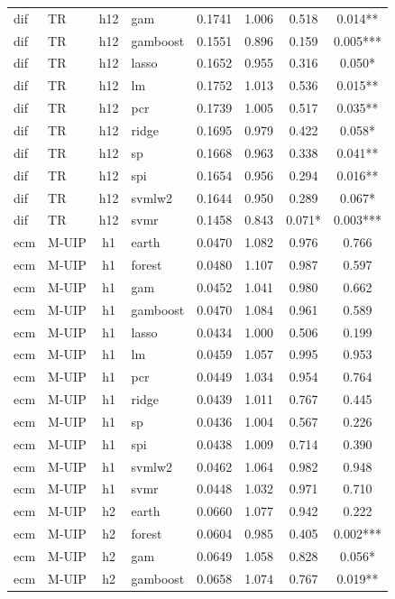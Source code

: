 \begin{ThreePartTable}
\begin{longtable}[t]{llclcccc}
dif & TR & h12 & gam & 0.1741 & 1.006 & 0.518 & 0.014**\\
dif & TR & h12 & gamboost & 0.1551 & 0.896 & 0.159 & 0.005***\\
dif & TR & h12 & lasso & 0.1652 & 0.955 & 0.316 & 0.050*\\
dif & TR & h12 & lm & 0.1752 & 1.013 & 0.536 & 0.015**\\
dif & TR & h12 & pcr & 0.1739 & 1.005 & 0.517 & 0.035**\\
dif & TR & h12 & ridge & 0.1695 & 0.979 & 0.422 & 0.058*\\
dif & TR & h12 & sp & 0.1668 & 0.963 & 0.338 & 0.041**\\
dif & TR & h12 & spi & 0.1654 & 0.956 & 0.294 & 0.016**\\
dif & TR & h12 & svmlw2 & 0.1644 & 0.950 & 0.289 & 0.067*\\
dif & TR & h12 & svmr & 0.1458 & 0.843 & 0.071* & 0.003***\\
\addlinespace
ecm & M-UIP & h1 & earth & 0.0470 & 1.082 & 0.976 & 0.766\\
ecm & M-UIP & h1 & forest & 0.0480 & 1.107 & 0.987 & 0.597\\
ecm & M-UIP & h1 & gam & 0.0452 & 1.041 & 0.980 & 0.662\\
ecm & M-UIP & h1 & gamboost & 0.0470 & 1.084 & 0.961 & 0.589\\
ecm & M-UIP & h1 & lasso & 0.0434 & 1.000 & 0.506 & 0.199\\
ecm & M-UIP & h1 & lm & 0.0459 & 1.057 & 0.995 & 0.953\\
ecm & M-UIP & h1 & pcr & 0.0449 & 1.034 & 0.954 & 0.764\\
ecm & M-UIP & h1 & ridge & 0.0439 & 1.011 & 0.767 & 0.445\\
ecm & M-UIP & h1 & sp & 0.0436 & 1.004 & 0.567 & 0.226\\
ecm & M-UIP & h1 & spi & 0.0438 & 1.009 & 0.714 & 0.390\\
ecm & M-UIP & h1 & svmlw2 & 0.0462 & 1.064 & 0.982 & 0.948\\
ecm & M-UIP & h1 & svmr & 0.0448 & 1.032 & 0.971 & 0.710\\
\addlinespace
ecm & M-UIP & h2 & earth & 0.0660 & 1.077 & 0.942 & 0.222\\
ecm & M-UIP & h2 & forest & 0.0604 & 0.985 & 0.405 & 0.002***\\
ecm & M-UIP & h2 & gam & 0.0649 & 1.058 & 0.828 & 0.056*\\
ecm & M-UIP & h2 & gamboost & 0.0658 & 1.074 & 0.767 & 0.019**\\

\end{longtable}
\end{ThreePartTable}
